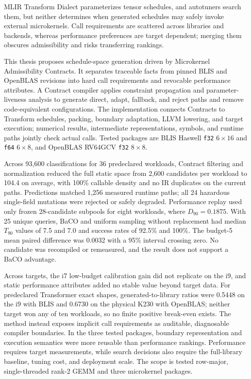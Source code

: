 \begin{engabstract}
MLIR Transform Dialect parameterizes tensor schedules, and autotuners search them, but neither determines when generated schedules may safely invoke external microkernels. Call requirements are scattered across libraries and backends, whereas performance preferences are target dependent; merging them obscures admissibility and risks transferring rankings.

This thesis proposes schedule-space generation driven by Microkernel Admissibility Contracts. It separates traceable facts from pinned BLIS and OpenBLAS revisions into hard call requirements and revocable performance attributes. A Contract compiler applies constraint propagation and parameter-liveness analysis to generate direct, adapt, fallback, and reject paths and remove code-equivalent configurations. The implementation connects Contracts to Transform schedules, packing, boundary adaptation, LLVM lowering, and target execution; numerical results, intermediate representations, symbols, and runtime paths jointly check actual calls. Tested packages are BLIS Haswell \texttt{f32} $6\times16$ and \texttt{f64} $6\times8$, and OpenBLAS RV64GCV \texttt{f32} $8\times8$.

Across 93,600 classifications for 36 predeclared workloads, Contract filtering and normalization reduced the full static space from 2,600 candidates per workload to 104.4 on average, with 100\% callable density and no IR duplicates on the current paths. Predictions matched 1,256 measured runtime paths; all 24 hazardous single-field mutations were rejected or safely degraded. Performance replay used only frozen 28-candidate subpools for eight workloads, where $D_{90}=0.1875$. With 25 unique queries, BaCO and uniform sampling without replacement had median $T_{90}$ values of 7.5 and 7.0 and success rates of 92.5\% and 100\%. The budget-5 mean paired difference was 0.0032 with a 95\% interval crossing zero. No candidate was recompiled or remeasured, and the result does not support a BaCO advantage.

Across targets, the i7 low-budget calibration gain did not replicate on the i9, and static performance attributes added no stable value beyond target data. For predeclared Transformer exact shapes, generated-to-library ratios were 0.5448 on the i9 with BLIS and 0.6730 on the physical K230 with OpenBLAS; neither target won any of ten workloads, so no finite positive break-even exists. The method instead exposes implicit call requirements as auditable, diagnosable compiler boundaries. In the three tested packages, boundary representation and execution semantics were more reusable than performance rankings. Performance requires target measurements, while search decisions also require the full-library baseline, tuning cost, and deployment scale. The scope is tested row-major, single-threaded rank-2 GEMM and three microkernel packages.

\end{engabstract}
